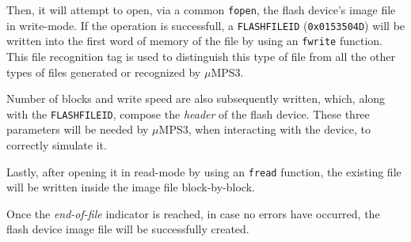 \documentclass[12pt,a4paper,openright,twoside]{report}
\begin{document}
	Then, it will attempt to open, via a common \texttt{fopen}, the flash device's image file in write-mode.
	If the operation is successfull, a \texttt{FLASHFILEID} (\texttt{0x0153504D}) will be written into the first word of memory of the file by using an \texttt{fwrite} function.
	This file recognition tag is used to distinguish this type of file from all the other types of files generated or recognized by $\mu$MPS3.
	
	Number of blocks and write speed are also subsequently written, which, along with the \texttt{FLASHFILEID}, compose the \textit{header} of the flash device.
	These three parameters will be needed by $\mu$MPS3, when interacting with the device, to correctly simulate it.
	
	Lastly, after opening it in read-mode by using an \texttt{fread} function, the existing file will be written inside the image file block-by-block.
	
	Once the \textit{end-of-file} indicator is reached, in case no errors have occurred, the flash device image file will be successfully created.
\end{document}
